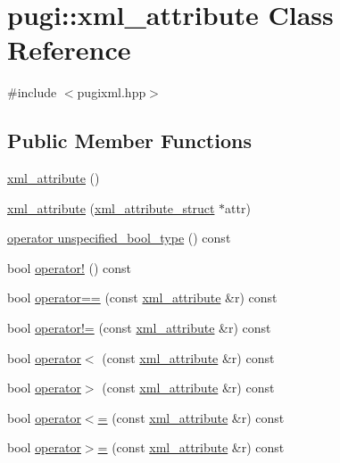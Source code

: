 \hypertarget{classpugi_1_1xml__attribute}{\section{pugi\-:\-:xml\-\_\-attribute Class Reference}
\label{classpugi_1_1xml__attribute}
}


{\ttfamily \#include $<$pugixml.\-hpp$>$}

\subsection*{Public Member Functions}
\begin{DoxyCompactItemize}
\item 
\hyperlink{classpugi_1_1xml__attribute_a03b24e1dfc445e8cb490cbb5b67dca9f}{xml\-\_\-attribute} ()
\item 
\hyperlink{classpugi_1_1xml__attribute_a32b0c063842c2073445cd8c89f1c0db2}{xml\-\_\-attribute} (\hyperlink{structpugi_1_1xml__attribute__struct}{xml\-\_\-attribute\-\_\-struct} $\ast$attr)
\item 
\hyperlink{classpugi_1_1xml__attribute_a108510c1375f1317b7ddb7d4bc15b707}{operator unspecified\-\_\-bool\-\_\-type} () const 
\item 
bool \hyperlink{classpugi_1_1xml__attribute_a0425c1b376c41d71f71416db9b1e1e6b}{operator!} () const 
\item 
bool \hyperlink{classpugi_1_1xml__attribute_ac1ab6dfce7d2a7aa0a6a24c7b84f0a5e}{operator==} (const \hyperlink{classpugi_1_1xml__attribute}{xml\-\_\-attribute} \&r) const 
\item 
bool \hyperlink{classpugi_1_1xml__attribute_a76b57111453b0873b0065fe3c2fe386d}{operator!=} (const \hyperlink{classpugi_1_1xml__attribute}{xml\-\_\-attribute} \&r) const 
\item 
bool \hyperlink{classpugi_1_1xml__attribute_ab887d475d793b4740e53e69b9f908af6}{operator$<$} (const \hyperlink{classpugi_1_1xml__attribute}{xml\-\_\-attribute} \&r) const 
\item 
bool \hyperlink{classpugi_1_1xml__attribute_a11ab6168bb3df31dd23956cc5bd0b871}{operator$>$} (const \hyperlink{classpugi_1_1xml__attribute}{xml\-\_\-attribute} \&r) const 
\item 
bool \hyperlink{classpugi_1_1xml__attribute_ae45e069db2452f535c349c5a605c90e6}{operator$<$=} (const \hyperlink{classpugi_1_1xml__attribute}{xml\-\_\-attribute} \&r) const 
\item 
bool \hyperlink{classpugi_1_1xml__attribute_afaff39714d8bd51f537f372d299d68cd}{operator$>$=} (const \hyperlink{classpugi_1_1xml__attribute}{xml\-\_\-attribute} \&r) const 

\end{DoxyCompactItemize}

